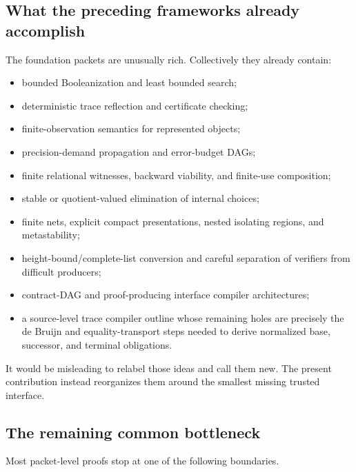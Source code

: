 \subsection{What the preceding frameworks already accomplish}

The foundation packets are unusually rich.  Collectively they already contain:

\begin{itemize}
\item bounded Booleanization and least bounded search;
\item deterministic trace reflection and certificate checking;
\item finite-observation semantics for represented objects;
\item precision-demand propagation and error-budget DAGs;
\item finite relational witnesses, backward viability, and finite-use composition;
\item stable or quotient-valued elimination of internal choices;
\item finite nets, explicit compact presentations, nested isolating regions, and metastability;
\item height-bound/complete-list conversion and careful separation of verifiers from difficult producers;
\item contract-DAG and proof-producing interface compiler architectures;
\item a source-level trace compiler outline whose remaining holes are precisely the de Bruijn and equality-transport steps needed to derive normalized base, successor, and terminal obligations.
\end{itemize}

It would be misleading to relabel those ideas and call them new.  The present contribution instead reorganizes them around the smallest missing trusted interface.

\subsection{The remaining common bottleneck}

Most packet-level proofs stop at one of the following boundaries.

